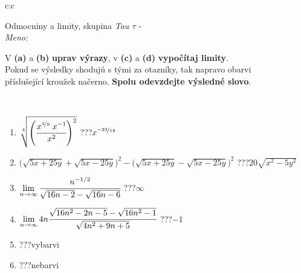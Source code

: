 \documentclass[10pt]{report}
\begin{document}
\newpage
\thispagestyle{empty}
\begin{tabular}{c:c}
\begin{minipage}[c][104.5mm][t]{0.5\linewidth}
\begin{center}
\vspace{7mm}
{\huge Odmocniny a limity, skupina \textit{Tau $\tau$} -}\\[5mm]
\textit{Meno:}\phantom{xxxxxxxxxxxxxxxxxxxxxxxxxxxxxxxxxxxxxxxxxxxxxxxxxxxxxxxxxxxxxxxxx}\\[5mm]
\begin{minipage}{0.95\linewidth}
\begin{center}
V \textbf{(a)} a \textbf{(b)} \textbf{uprav výrazy}, v \textbf{(c)} a \textbf{(d)} \textbf{vypočítaj limity}.\\Pokud se výsledky shodujú s tými za otazníky, tak napravo obarvi\\příslušející kroužek načerno. \textbf{Spolu odevzdejte výsledné slovo}.
\end{center}
\end{minipage}
\\[1mm]
\begin{minipage}{0.79\linewidth}
\begin{center}
\begin{varwidth}{\linewidth}
\begin{enumerate}
\small
\item $\sqrt[4]{\left(\cfrac{x^{\nicefrac{4}{9}}\;x^{-1}}{x^{2}}\right)^{2}}$\quad \dotfill\; ???\;\dotfill \quad $x^{\nicefrac{-23}{18}}$
\item {\footnotesize{\scriptsize$\big(\sqrt{5x+25y}+\sqrt{5x-25y}\big)^2-\big(\sqrt{5x+25y}-\sqrt{5x-25y}\big)^2$}\quad \dotfill\; ???\;\dotfill \quad $20\sqrt{x^2-5y^2}$}
\item $\lim\limits_{n\to\infty}\cfrac{n^{-1/2}}{\sqrt{16n-2}-\sqrt{16n-6}}$\quad \dotfill\; ???\;\dotfill \quad $\infty$
\item $\lim\limits_{n\to\infty}4n\cfrac{\sqrt{16n^2-2n-5}-\sqrt{16n^2-1}}{\sqrt{4n^2+9n+5}}$\quad \dotfill\; ???\;\dotfill \quad $-1$
\item \quad \dotfill\; ???\;\dotfill \quad vybarvi
\item \quad \dotfill\; ???\;\dotfill \quad nebarvi
\end{enumerate}
\end{varwidth}
\end{center}
\end{minipage}
\begin{minipage}{0.20\linewidth}

\end{minipage}
\end{center}
\end{minipage}
\end{tabular}
\end{document}
